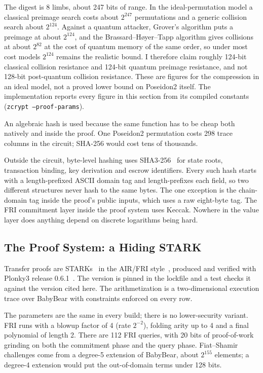 \documentclass[twocolumn,10pt]{article}
\begin{document}
The digest is 8 limbs, about 247 bits of range. In the ideal-permutation model a classical preimage search costs about $2^{247}$ permutations and a generic collision search about $2^{124}$. Against a quantum attacker, Grover's algorithm puts a preimage at about $2^{124}$, and the Brassard--H{\o}yer--Tapp algorithm gives collisions at about $2^{82}$ at the cost of quantum memory of the same order, so under most cost models $2^{124}$ remains the realistic bound. I therefore claim roughly 124-bit classical collision resistance and 124-bit quantum preimage resistance, and not 128-bit post-quantum collision resistance. These are figures for the compression in an ideal model, not a proved lower bound on Poseidon2 itself. The implementation reports every figure in this section from its compiled constants (\texttt{zcrypt --proof-params}).

An algebraic hash is used because the same function has to be cheap both natively and inside the proof. One Poseidon2 permutation costs 298 trace columns in the circuit; SHA-256 would cost tens of thousands.

Outside the circuit, byte-level hashing uses SHA3-256~\cite{fips202} for state roots, transaction binding, key derivation and escrow identifiers. Every such hash starts with a length-prefixed ASCII domain tag and length-prefixes each field, so two different structures never hash to the same bytes. The one exception is the chain-domain tag inside the proof's public inputs, which uses a raw eight-byte tag. The FRI commitment layer inside the proof system uses Keccak. Nowhere in the value layer does anything depend on discrete logarithms being hard.

\subsection{The Proof System: a Hiding STARK}
\label{sec:stark}

Transfer proofs are STARKs~\cite{stark} in the AIR/FRI style~\cite{fri}, produced and verified with Plonky3 release 0.6.1~\cite{plonky3}. The version is pinned in the lockfile and a test checks it against the version cited here. The arithmetization is a two-dimensional execution trace over BabyBear with constraints enforced on every row.

The parameters are the same in every build; there is no lower-security variant. FRI runs with a blowup factor of 4 (rate $2^{-2}$), folding arity up to 4 and a final polynomial of length 2. There are 112 FRI queries, with 20 bits of proof-of-work grinding on both the commitment phase and the query phase. Fiat--Shamir challenges come from a degree-5 extension of BabyBear, about $2^{155}$ elements; a degree-4 extension would put the out-of-domain terms under 128 bits.
\end{document}
